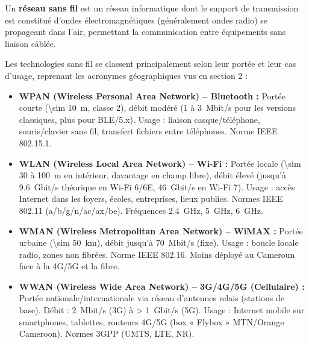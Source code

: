 \documentclass[11pt]{article}
\begin{document}
\begin{definition}
Un \textbf{réseau sans fil} est un réseau informatique dont le support de transmission est constitué d'ondes électromagnétiques (généralement ondes radio) se propageant dans l'air, permettant la communication entre équipements sans liaison câblée.
\end{definition}

Les technologies sans fil se classent principalement selon leur portée et leur cas d'usage, reprenant les acronymes géographiques vus en section 2 :

\begin{itemize}
    \item \textbf{WPAN (Wireless Personal Area Network) -- Bluetooth :} Portée courte (\SI{\sim 10}{\meter}, classe 2), débit modéré (\SI{1 à 3}{Mbit/s} pour les versions classiques, plus pour BLE/5.x). Usage : liaison casque/téléphone, souris/clavier sans fil, transfert fichiers entre téléphones. Norme IEEE 802.15.1.
    \item \textbf{WLAN (Wireless Local Area Network) -- Wi-Fi :} Portée locale (\SI{\sim 30 à 100}{\meter} en intérieur, davantage en champ libre), débit élevé (jusqu'à \SI{9,6}{Gbit/s} théorique en Wi-Fi 6/6E, \SI{46}{Gbit/s} en Wi-Fi 7). Usage : accès Internet dans les foyers, écoles, entreprises, lieux publics. Normes IEEE 802.11 (a/b/g/n/ac/ax/be). Fréquences \SI{2,4}{GHz}, \SI{5}{GHz}, \SI{6}{GHz}.
    \item \textbf{WMAN (Wireless Metropolitan Area Network) -- WiMAX :} Portée urbaine (\SI{\sim 50}{km}), débit jusqu'à \SI{70}{Mbit/s} (fixe). Usage : boucle locale radio, zones non fibrées. Norme IEEE 802.16. Moins déployé au Cameroun face à la 4G/5G et la fibre.
    \item \textbf{WWAN (Wireless Wide Area Network) -- 3G/4G/5G (Cellulaire) :} Portée nationale/internationale via réseau d'antennes relais (stations de base). Débit : \SI{2}{Mbit/s} (3G) à \SI{> 1}{Gbit/s} (5G). Usage : Internet mobile sur smartphones, tablettes, routeurs 4G/5G (box « Flybox » MTN/Orange Cameroon). Normes 3GPP (UMTS, LTE, NR).
\end{itemize}
\end{document}
